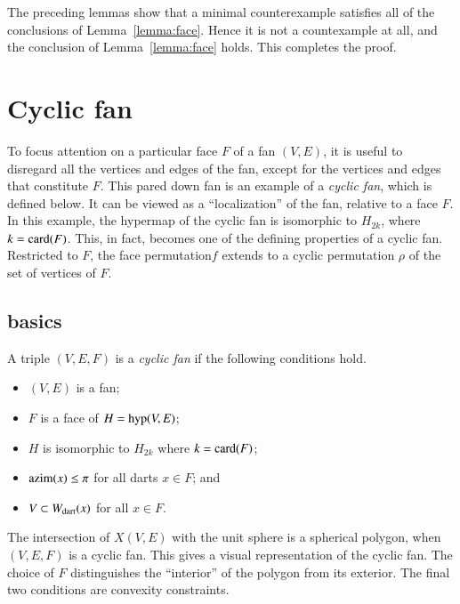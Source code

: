 The preceding lemmas show that a minimal counterexample satisfies all of the conclusions of Lemma~\ref{lemma:face}.  Hence it is not a countexample at all, and the conclusion of Lemma~\ref{lemma:face} holds.  This completes the proof.

\section{Cyclic fan}

To focus attention on a particular face $F$ of a fan $(V,E)$, it is useful to disregard all the vertices
and edges of the fan, except for the vertices and edges that constitute $F$.  This pared down fan
is an example of a {\it cyclic fan}, which is defined below.  It can be viewed as a ``localization'' of
the fan, relative to a face $F$.  In this example, the hypermap of the cyclic fan  is isomorphic to $H_{2k}$, where $k={\operatorname{card}}(F)$.  This, in fact, becomes one of the defining properties of a cyclic fan.
Restricted to $F$, the face permutation$f$ extends to a cyclic
permutation $\rho$ of the set of vertices of $F$.

\subsection{basics}


\begin{definition}  A triple $(V,E,F)$ is a {\it cyclic fan} if the following conditions hold.
\begin{itemize} 
\item $(V,E)$ is a fan;
\item $F$ is a face of $H = {\operatorname{hyp}}(V,E)$;
\item $H$ is isomorphic to $H_{2k}$ where $k = {\operatorname{card}}(F)$;
\item ${\operatorname{azim}}(x)\le \pi$ for all darts $x\in F$; and
\item $V\subset W_{\text{dart}}(x)$ for all $x\in F$.
\end{itemize}
\end{definition}

The intersection of $X(V,E)$ with the unit sphere is a spherical polygon, when $(V,E,F)$ is a cyclic fan.  This gives a visual representation of the cyclic fan. The choice of $F$ distinguishes the ``interior'' of the polygon from its exterior.  The final two conditions are convexity constraints.

